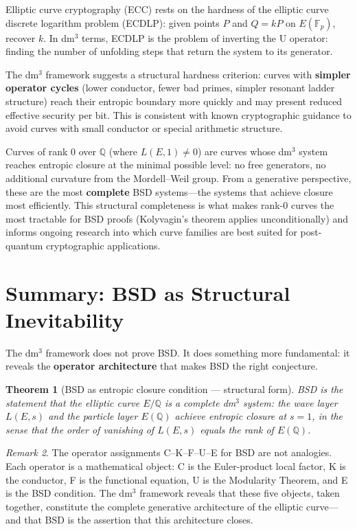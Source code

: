 \documentclass[14pt, twoside, openright]{book}
\newtheorem{theorem}{Theorem}[chapter]
\theoremstyle{definition}
\theoremstyle{remark}
\newtheorem{remark}[theorem]{Remark}
\begin{document}
Elliptic curve cryptography (ECC) rests on the hardness of the elliptic curve
discrete logarithm problem (ECDLP): given points $P$ and $Q = kP$ on
$E(\mathbb{F}_p)$, recover $k$. In dm$^{3}$ terms, ECDLP is the problem of
inverting the U operator: finding the number of unfolding steps that return the
system to its generator.

The dm$^{3}$ framework suggests a structural hardness criterion: curves with
\textbf{simpler operator cycles} (lower conductor, fewer bad primes, simpler
resonant ladder structure) reach their entropic boundary more quickly and may
present reduced effective security per bit. This is consistent with known
cryptographic guidance to avoid curves with small conductor or special arithmetic
structure.

Curves of rank 0 over $\mathbb{Q}$ (where $L(E,1) \neq 0$) are curves whose
dm$^{3}$ system reaches entropic closure at the minimal possible level: no free
generators, no additional curvature from the Mordell--Weil group. From a
generative perspective, these are the most \textbf{complete} BSD systems---the
systems that achieve closure most efficiently. This structural completeness is
what makes rank-0 curves the most tractable for BSD proofs (Kolyvagin's theorem
applies unconditionally) and informs ongoing research into which curve families
are best suited for post-quantum cryptographic applications.

\section{Summary: BSD as Structural Inevitability}

The dm$^{3}$ framework does not prove BSD. It does something more fundamental:
it reveals the \textbf{operator architecture} that makes BSD the right conjecture.

\begin{theorem}[BSD as entropic closure condition --- structural form]
BSD is the statement that the elliptic curve $E/\mathbb{Q}$ is a complete
dm$^{3}$ system: the wave layer $L(E,s)$ and the particle layer $E(\mathbb{Q})$
achieve entropic closure at $s = 1$, in the sense that the order of vanishing
of $L(E,s)$ equals the rank of $E(\mathbb{Q})$.
\end{theorem}

\begin{remark}
The operator assignments C--K--F--U--E for BSD are not analogies. Each operator
is a mathematical object: C is the Euler-product local factor, K is the conductor,
F is the functional equation, U is the Modularity Theorem, and E is the BSD
condition. The dm$^{3}$ framework reveals that these five objects, taken together,
constitute the complete generative architecture of the elliptic curve---and that
BSD is the assertion that this architecture closes.
\end{remark}
\end{document}
